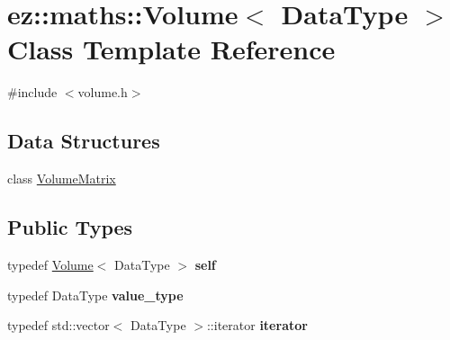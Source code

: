 \hypertarget{classez_1_1maths_1_1Volume}{}\section{ez\+:\+:maths\+:\+:Volume$<$ Data\+Type $>$ Class Template Reference}
\label{classez_1_1maths_1_1Volume}


{\ttfamily \#include $<$volume.\+h$>$}

\subsection*{Data Structures}
\begin{DoxyCompactItemize}
\item 
class \hyperlink{classez_1_1maths_1_1Volume_1_1VolumeMatrix}{Volume\+Matrix}
\end{DoxyCompactItemize}
\subsection*{Public Types}
\begin{DoxyCompactItemize}
\item 
\mbox{\label{classez_1_1maths_1_1Volume_ad665ced92afef5d6b280f21a2da5d626}} 
typedef \hyperlink{classez_1_1maths_1_1Volume}{Volume}$<$ Data\+Type $>$ {\bfseries self}
\item 
\mbox{\label{classez_1_1maths_1_1Volume_a4e05631a90197c6236828e916a51c6d4}} 
typedef Data\+Type {\bfseries value\+\_\+type}
\item 
\mbox{\label{classez_1_1maths_1_1Volume_a918f48d72d4a85a3782d728f9e5f330a}} 
typedef std\+::vector$<$ Data\+Type $>$\+::iterator {\bfseries iterator}
\end{DoxyCompactItemize}
